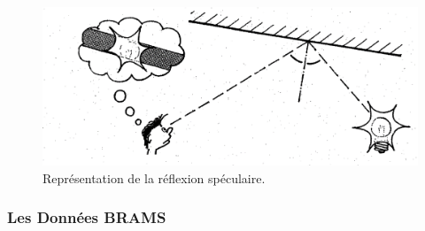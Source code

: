 \documentclass[11pt]{article}
\begin{document}
\begin{figure}[t]
    \begin{center}
        \includegraphics[scale=0.6]{SpecularReflection.png}
        \caption{Représentation de la réflexion spéculaire.}
    \end{center}
\end{figure}

\subsubsection{Les Données BRAMS}
\end{document}
